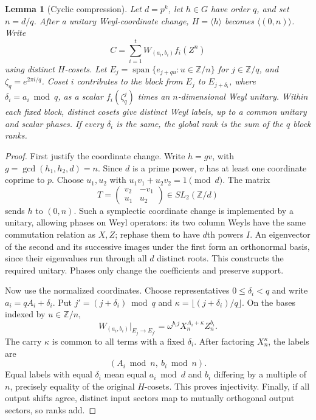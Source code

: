 \documentclass[11pt,a4paper]{article}
\newtheorem{lemma}[theorem]{Lemma}
\theoremstyle{remark}\newtheorem{remark}[theorem]{Remark}
\newcommand{\Z}{\mathbb Z}
\begin{document}
\begin{lemma}[Cyclic compression]\label{lem:blocks}
Let $d=p^k$, let $h\in G$ have order $q$, and set $n=d/q$. After a unitary Weyl-coordinate change, $H=\langle h\rangle$ becomes $\langle(0,n)\rangle$. Write
\[
 C=\sum_{i=1}^t W_{(a_i,b_i)}f_i(Z^n)
\]
using distinct $H$-cosets. Let $E_j=\operatorname{span}\{e_{j+qu}:u\in\Z/n\}$ for $j\in\Z/q$, and $\zeta_q=e^{2\pi i/q}$. Coset $i$ contributes to the block from $E_j$ to $E_{j+\delta_i}$, where $\delta_i=a_i\bmod q$, as a scalar $f_i(\zeta_q^j)$ times an $n$-dimensional Weyl unitary. Within each fixed block, distinct cosets give distinct Weyl labels, up to a common unitary and scalar phases. If every $\delta_i$ is the same, the global rank is the sum of the $q$ block ranks.
\end{lemma}
\begin{proof}
First justify the coordinate change. Write $h=g v$, with $g=\gcd(h_1,h_2,d)=n$. Since $d$ is a prime power, $v$ has at least one coordinate coprime to $p$. Choose $u_1,u_2$ with $u_1v_1+u_2v_2=1\pmod d$. The matrix
\[
 T=\begin{pmatrix}v_2&-v_1\\u_1&u_2\end{pmatrix}\in SL_2(\Z/d)
\]
sends $h$ to $(0,n)$. Such a symplectic coordinate change is implemented by a unitary, allowing phases on Weyl operators: its two column Weyls have the same commutation relation as $X,Z$; rephase them to have $d$th powers $I$. An eigenvector of the second and its successive images under the first form an orthonormal basis, since their eigenvalues run through all $d$ distinct roots. This constructs the required unitary. Phases only change the coefficients and preserve support.

Now use the normalized coordinates. Choose representatives $0\le\delta_i<q$ and write $a_i=qA_i+\delta_i$. Put $j'=(j+\delta_i)\bmod q$ and $\kappa=\lfloor(j+\delta_i)/q\rfloor$. On the bases indexed by $u\in\Z/n$,
\begin{equation}\label{eq:blockformula}
 W_{(a_i,b_i)}|_{E_j\to E_{j'}}
 =\omega^{b_i j}X_n^{A_i+\kappa}Z_n^{b_i}.
\end{equation}
The carry $\kappa$ is common to all terms with a fixed $\delta_i$. After factoring $X_n^\kappa$, the labels are
\[
 (A_i\bmod n,\ b_i\bmod n).
\]
Equal labels with equal $\delta_i$ mean equal $a_i\bmod d$ and $b_i$ differing by a multiple of $n$, precisely equality of the original $H$-cosets. This proves injectivity. Finally, if all output shifts agree, distinct input sectors map to mutually orthogonal output sectors, so ranks add.
\end{proof}
\end{document}
